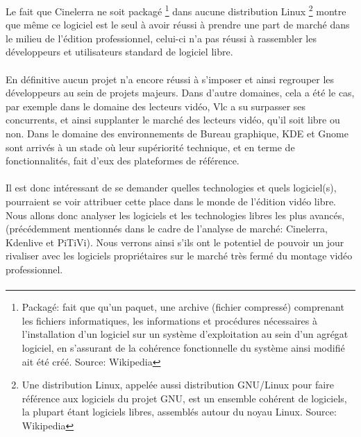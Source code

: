 
Le fait que Cinelerra ne soit packagé \footnote{Packagé: fait
que qu'un paquet, une archive (fichier compressé) comprenant les
fichiers informatiques, les informations et procédures nécessaires
à l'installation d'un logiciel sur un système d'exploitation au sein
d'un agrégat logiciel, en s'assurant de la cohérence fonctionnelle
du système ainsi modifié ait été créé. Source: Wikipedia} dans
aucune distribution Linux \footnote {Une distribution Linux, appelée
aussi distribution GNU/Linux pour faire référence aux logiciels du
projet GNU, est un ensemble cohérent de logiciels, la plupart étant
logiciels libres, assemblés autour du noyau Linux. Source: Wikipedia}
montre que même ce logiciel est le seul à avoir réussi à prendre une
part de marché dans le milieu de l'édition professionnel, celui-ci n'a
pas réussi à rassembler les développeurs et utilisateurs standard de
logiciel libre.

\paragraph{}

En définitive aucun projet n'a encore réussi à s'imposer et ainsi
regrouper les développeurs au sein de projets majeurs. Dans d'autre
domaines, cela a été le cas, par exemple dans le domaine des lecteurs
vidéo, Vlc a su surpasser ses concurrents, et ainsi supplanter le
marché des lecteurs vidéo, qu'il soit libre ou non. Dans le domaine
des environnements de Bureau graphique, KDE et Gnome sont arrivés à un
stade où leur supériorité technique, et en terme de fonctionnalités,
fait d'eux des plateformes de référence.

\paragraph{}

Il est donc intéressant de se demander quelles technologies et quels
logiciel(s), pourraient se voir attribuer cette place dans le monde
de l'édition vidéo libre. Nous allons donc analyser les logiciels et
les technologies libres les plus avancés, (précédemment mentionnés
dans le cadre de l'analyse de marché: Cinelerra, Kdenlive et PiTiVi).
Nous verrons ainsi s'ils ont le potentiel de pouvoir un jour rivaliser
avec les logiciels propriétaires sur le marché très fermé du montage
vidéo professionnel.

\paragraph{}

